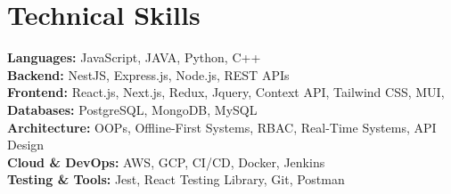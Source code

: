 \section{Technical Skills}
\vspace{2pt}

\begin{itemize}[leftmargin=0.15in, label={}]
\small{\item{

\textbf{Languages:} JavaScript, JAVA, Python, C++ \\[4pt]

\textbf{Backend:} NestJS, Express.js, Node.js, REST APIs \\[4pt]

\textbf{Frontend:} React.js, Next.js, Redux, Jquery, Context API, Tailwind CSS, MUI, \\[4pt]

\textbf{Databases:} PostgreSQL, MongoDB, MySQL \\[4pt]

\textbf{Architecture:} OOPs, Offline-First Systems, RBAC, Real-Time Systems, API Design \\[4pt]

\textbf{Cloud \& DevOps:} AWS, GCP, CI/CD, Docker, Jenkins \\[4pt]

\textbf{Testing \& Tools:} Jest, React Testing Library, Git, Postman

}}
\end{itemize}